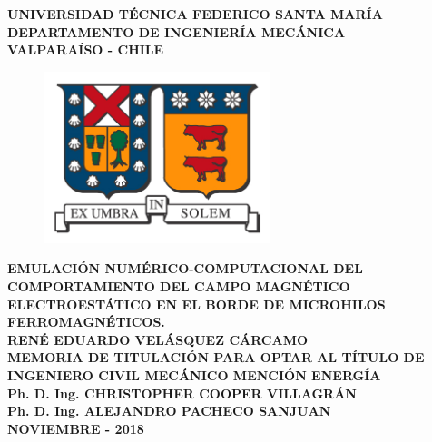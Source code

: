 \begin{titlepage}
	
	\begin{center}
		\vspace*{\baselineskip}
		
		\Large \textbf{UNIVERSIDAD TÉCNICA FEDERICO SANTA MARÍA}\\
		\vspace*{0.15in}
		\large \textbf{DEPARTAMENTO DE INGENIERÍA MECÁNICA} \\
		\vspace*{0.15in}
		\textbf{VALPARAÍSO - CHILE}
		
		\begin{figure}[h!]
			\centering\includegraphics[height=50mm]{Imagenes/logousm.jpg} 
		\end{figure}
		\vspace*{0.15in}
		\Large \textbf{EMULACIÓN NUMÉRICO-COMPUTACIONAL DEL COMPORTAMIENTO DEL CAMPO MAGNÉTICO ELECTROESTÁTICO EN EL BORDE DE MICROHILOS FERROMAGNÉTICOS.}\\
		\vspace*{1in}
		\large\centering \textbf{RENÉ EDUARDO VELÁSQUEZ CÁRCAMO}\\
		\vspace*{0.15in}
		\centering\normalsize \textbf{MEMORIA DE TITULACIÓN PARA OPTAR AL TÍTULO DE INGENIERO CIVIL MECÁNICO MENCIÓN ENERGÍA}\\
		\vspace*{0.6in}
		\centering\normalsize \textbf{}
		 \textbf{\hfill{Ph. D. Ing. CHRISTOPHER COOPER VILLAGRÁN}}\\
		\vspace*{0.15in}
		\centering\normalsize \textbf{} \hfill{\textbf{Ph. D. Ing. ALEJANDRO PACHECO SANJUAN}}\\
		\vspace*{1in}
		\centering\normalsize \textbf{NOVIEMBRE - 2018}\\
	\end{center}
\afterpage{\null\newpage}
\pagestyle{empty}
\newpage
	
\end{titlepage}